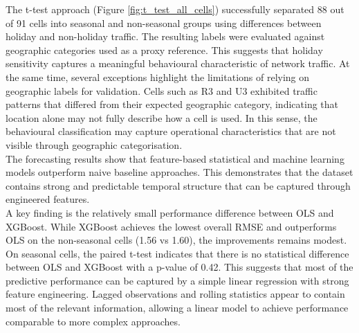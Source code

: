 
The t-test approach (Figure \ref{fig:t_test_all_cells}) successfully separated 88 out of 91 cells into seasonal and non-seasonal groups using differences between holiday and non-holiday traffic. The resulting labels were evaluated against geographic categories used as a proxy reference. This suggests that holiday sensitivity captures a meaningful behavioural characteristic of network traffic. At the same time, several exceptions highlight the limitations of relying on geographic labels for validation. Cells such as R3 and U3 exhibited traffic patterns that differed from their expected geographic category, indicating that location alone may not fully describe how a cell is used. In this sense, the behavioural classification may capture operational characteristics that are not visible through geographic categorisation. \\

The forecasting results show that feature-based statistical and machine learning models outperform naive baseline approaches. This demonstrates that the dataset contains strong and predictable temporal structure that can be captured through engineered features. \\

A key finding is the relatively small performance difference between OLS and XGBoost. While XGBoost achieves the lowest overall RMSE and outperforms OLS on the non-seasonal cells (1.56 vs 1.60), the improvements remains modest. On seasonal cells, the paired t-test indicates that there is no statistical difference between OLS and XGBoost with a p-value of 0.42. This suggests that most of the predictive performance can be captured by a simple linear regression with strong feature engineering. Lagged observations and rolling statistics appear to contain most of the relevant information, allowing a linear model to achieve performance comparable to more complex approaches. \\

